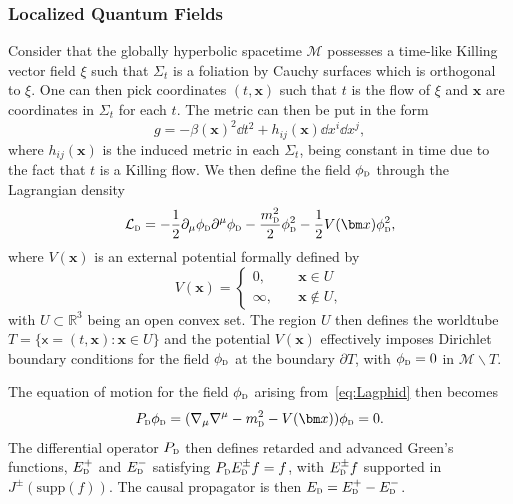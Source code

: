 \documentclass[letterpaper,12pt,titlepage,oneside,final]{book}
\newcommand{\M}{\mathcal{M}}
\newcommand{\mf}{\mathsf}%
\newcommand{\tc}[1]{\textsc{#1}}
\begin{document}
\subsubsection*{Localized Quantum Fields}

Consider that the globally hyperbolic spacetime $\M$ possesses a time-like Killing vector field $\xi$ such that $\Sigma_t$ is a foliation by Cauchy surfaces which is orthogonal to $\xi$. One can then pick coordinates $(t,\bm x)$ such that $t$ is the flow of $\xi$ and $\bm x$ are coordinates in $\Sigma_t$ for each $t$. The metric can then be put in the form
\begin{equation}\label{eq:staticmetric}
    g = - \beta(\bm x)^2 \dd t^2 + h_{ij}(\bm x) \dd x^i \dd x^j,
\end{equation} 
where $h_{ij}(\bm x)$ is the induced metric in each $\Sigma_t$, being constant in time due to the fact that $t$ is a Killing flow. We then define the field $\phi_\tc{d}$ through the Lagrangian density
\begin{equation}\label{eq:Lagphid}
    \mathcal{L}_\tc{d} = - \frac{1}{2}\partial_\mu \phi_\tc{d}\partial^\mu \phi_\tc{d} - \frac{m_\tc{d}^2}{2}\phi_\tc{d}^2 - \frac{1}{2}V(\bm x)\phi_\tc{d}^2,
\end{equation}
where $V(\bm x)$ is an external potential formally defined by
\begin{equation}\label{eq:Vcompact}
    V(\bm x) = \begin{cases}
    0, \quad &\bm x \in U\\
    \infty , \quad &\bm x \notin U,
    \end{cases}
\end{equation}
with $U\subset \mathbb{R}^3$ being an open convex set. The region $U$ then defines the worldtube $T = \{\mf x = (t,\bm x): \bm x \in U\}$ and the potential $V(\bm x)$ effectively imposes Dirichlet boundary conditions for the field $\phi_\tc{d}$ at the boundary $\partial T$, with $\phi_\tc{d} = 0$ in $\M\backslash T$.

The equation of motion for the field $\phi_\tc{d}$ arising from~\eqref{eq:Lagphid} then becomes
\begin{equation}\label{eq:Pd}
    P_\tc{d}\phi_\tc{d} = (\nabla_\mu \nabla^\mu - m_\tc{d}^2 - V(\bm x))\phi_\tc{d} = 0.
\end{equation}
The differential operator $P_\tc{d}$ then defines retarded and advanced Green's functions, $E_\tc{d}^+$ and $E_\tc{d}^-$ satisfying $P_\tc{d}E_\tc{d}^\pm f = f$, with $E_\tc{d}^\pm f$ supported in $J^\pm(\text{supp}(f))$. The causal propagator is then $E_\tc{d} = E_\tc{d}^+ - E_\tc{d}^-$.
\end{document}
